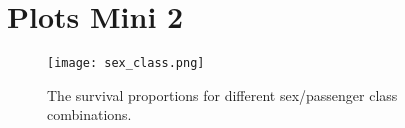\documentclass[11pt,twoside,swedish]{article}
\begin{document}
\newpage
\section{Plots Mini 2}\label{Plots Mini 2}

\graphicspath{{/home/mikael/Repos/Courses/msa220/Mini/Mini2/Titanic/}}
\begin{figure}
\begin{center}
\texttt{[image: sex\_class.png]}
\caption{The survival proportions for different sex/passenger class combinations.}
\label{titanic sex pclass}
\end{center}
\end{figure}


\newpage
\printbibliography
\end{document}
